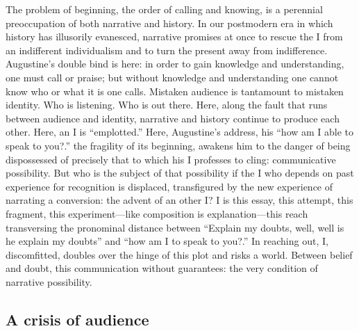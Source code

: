 \documentclass[
]{memoir}
\begin{document}
The problem of beginning, the order of calling and knowing, is a
perennial preoccupation of both narrative and history. In our postmodern
era in which history has illusorily evanesced, narrative promises at
once to rescue the I from an indifferent individualism and to turn the
present away from indifference. Augustine's double bind is here: in
order to gain knowledge and understanding, one must call or praise; but
without knowledge and understanding one cannot know who or what it is
one calls. Mistaken audience is tantamount to mistaken identity. Who is
listening. Who is out there. Here, along the fault that runs between
audience and identity, narrative and history continue to produce each
other. Here, an I is ``emplotted.'' Here, Augustine's address, his ``how
am I able to speak to you?.'' the fragility of its beginning, awakens
him to the danger of being dispossessed of precisely that to which his I
professes to cling: communicative possibility. But who is the subject of
that possibility if the I who depends on past experience for recognition
is displaced, transfigured by the new experience of narrating a
conversion: the advent of an other I? I is this essay, this attempt,
this fragment, this experiment---like composition is explanation---this
reach transversing the pronominal distance between ``Explain my doubts,
well, well is he explain my doubts'' and ``how am I to speak to you?.''
In reaching out, I, discomfitted, doubles over the hinge of this plot
and risks a world. Between belief and doubt, this communication without
guarantees: the very condition of narrative possibility.

\hypertarget{a-crisis-of-audience}{%
\subsection*{A crisis of audience}\label{a-crisis-of-audience}}
\end{document}
